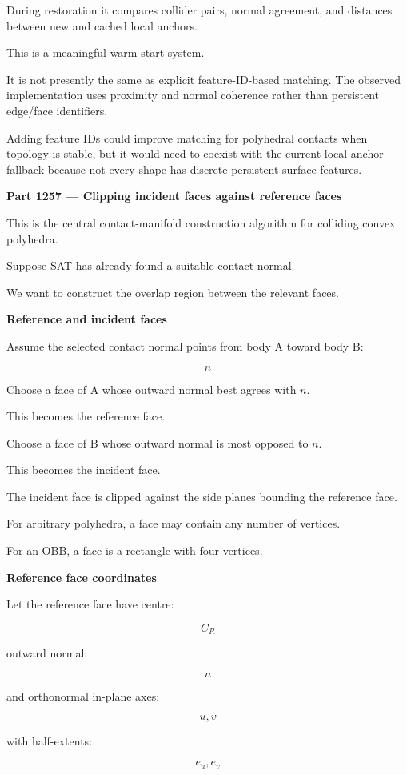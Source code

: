 During restoration it compares collider pairs, normal agreement, and distances between new and cached local anchors.

This is a meaningful warm-start system.

It is not presently the same as explicit feature-ID-based matching. The observed implementation uses proximity and normal coherence rather than persistent edge/face identifiers.

Adding feature IDs could improve matching for polyhedral contacts when topology is stable, but it would need to coexist with the current local-anchor fallback because not every shape has discrete persistent surface features.

\textbf{Part 1257 --- Clipping incident faces against reference faces}

This is the central contact-manifold construction algorithm for colliding convex polyhedra.

Suppose SAT has already found a suitable contact normal.

We want to construct the overlap region between the relevant faces.

\textbf{Reference and incident faces}

Assume the selected contact normal points from body A toward body B:

\[
n
\]

Choose a face of A whose outward normal best agrees with \(n\).

This becomes the reference face.

Choose a face of B whose outward normal is most opposed to \(n\).

This becomes the incident face.

The incident face is clipped against the side planes bounding the reference face.

For arbitrary polyhedra, a face may contain any number of vertices.

For an OBB, a face is a rectangle with four vertices.

\textbf{Reference face coordinates}

Let the reference face have centre:

\[
C_R
\]

outward normal:

\[
n
\]

and orthonormal in-plane axes:

\[
u,v
\]

with half-extents:

\[
e_u,e_v
\]


